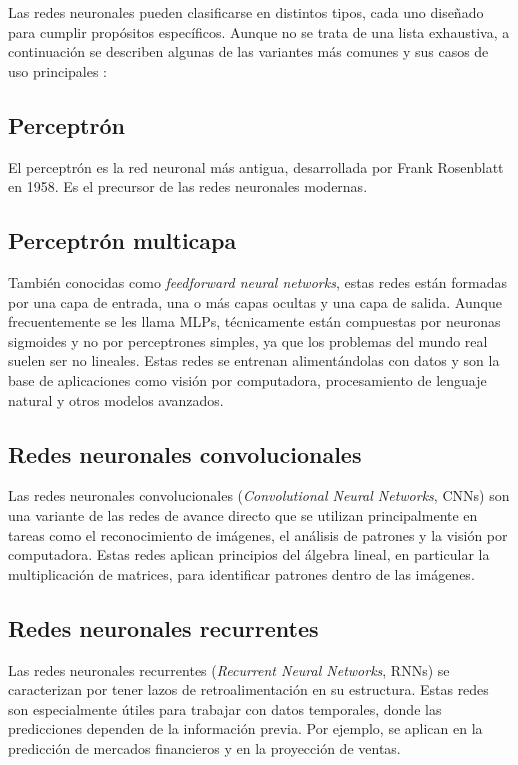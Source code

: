 Las redes neuronales pueden clasificarse en distintos tipos, cada uno diseñado para cumplir propósitos específicos. Aunque no se trata de una lista exhaustiva, a continuación se describen algunas de las variantes más comunes y sus casos de uso principales \cite{L11}:


\subsection{Perceptrón} 
El perceptrón es la red neuronal más antigua, desarrollada por Frank Rosenblatt en 1958. Es el precursor de las redes neuronales modernas.  

\subsection{Perceptrón multicapa} 
También conocidas como \textit{feedforward neural networks}, estas redes están formadas por una capa de entrada, una o más capas ocultas y una capa de salida. Aunque frecuentemente se les llama MLPs, técnicamente están compuestas por neuronas sigmoides y no por perceptrones simples, ya que los problemas del mundo real suelen ser no lineales. Estas redes se entrenan alimentándolas con datos y son la base de aplicaciones como visión por computadora, procesamiento de lenguaje natural y otros modelos avanzados.

\subsection{Redes neuronales convolucionales} 
Las redes neuronales convolucionales (\textit{Convolutional Neural Networks}, CNNs) son una variante de las redes de avance directo que se utilizan principalmente en tareas como el reconocimiento de imágenes, el análisis de patrones y la visión por computadora. Estas redes aplican principios del álgebra lineal, en particular la multiplicación de matrices, para identificar patrones dentro de las imágenes.

\subsection{Redes neuronales recurrentes} 
Las redes neuronales recurrentes (\textit{Recurrent Neural Networks}, RNNs) se caracterizan por tener lazos de retroalimentación en su estructura. Estas redes son especialmente útiles para trabajar con datos temporales, donde las predicciones dependen de la información previa. Por ejemplo, se aplican en la predicción de mercados financieros y en la proyección de ventas.


